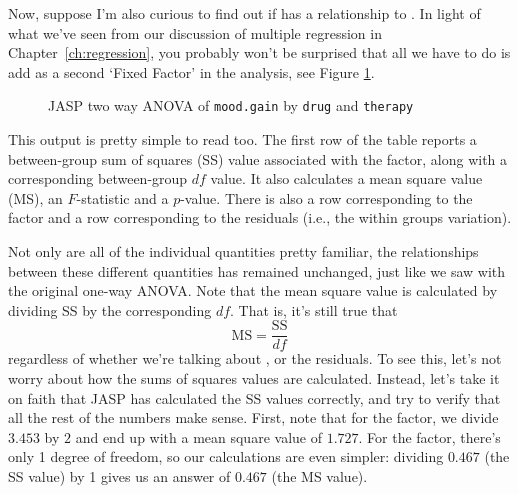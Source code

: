 Now, suppose I'm also curious to find out if  has a relationship to . In light of what we've seen from our discussion of multiple regression in Chapter~\ref{ch:regression}, you probably won't be surprised that all we have to do is add  as a second `Fixed Factor' in the analysis, see Figure \ref{fig:factorialanova3}.

\begin{figure}[!htb]
\begin{center}
\caption{JASP two way ANOVA of \texttt{mood.gain} by \texttt{drug} and \texttt{therapy}}
\label{fig:factorialanova3}
\HR
\end{center}
\end{figure}

This output is pretty simple to read too. The first row of the table reports a between-group sum of squares (SS) value associated with the  factor, along with a corresponding between-group $df$ value. It also calculates a mean square value (MS), an $F$-statistic and a $p$-value. There is also a row corresponding to the  factor and a row corresponding to the residuals (i.e., the within groups variation). 

Not only are all of the individual quantities pretty familiar, the relationships between these different quantities has remained unchanged, just like we saw with the original one-way ANOVA. Note that the mean square value is calculated by dividing SS by the corresponding $df$. That is, it's still true that
$$
\mbox{MS} = \frac{\mbox{SS}}{df}
$$
regardless of whether we're talking about ,  or the residuals. To see this, let's not worry about how the sums of squares values are calculated. Instead, let's take it on faith that JASP has calculated the SS values correctly, and try to verify that all the rest of the numbers make sense. First, note that for the  factor, we divide $3.453$ by $2$ and end up with a mean square value of $1.727$. For the  factor, there's only 1 degree of freedom, so our calculations are even simpler: dividing $0.467$ (the SS value) by 1 gives us an answer of $0.467$ (the MS value). 

